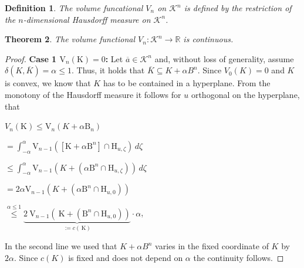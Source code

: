 \documentclass[a4paper]{book}
\newtheorem{theorem}{Theorem}%
\newtheorem{definition}[theorem]{Definition}%
\numberwithin{theorem}{section}%
\begin{document}
\begin{definition}
	The volume funcational $V_{n}$ on $\mathscr{K}^{n}$ is defined by the restriction of the $n$-dimensional Hausdorff measure on $\mathscr{K}^{n}$.
\end{definition}

\begin{theorem}
	The volume functional $V_{n}:\mathscr{K}^{n}\to\mathbb{R}$ is continuous.
\end{theorem}
\begin{proof}
    \textbf{Case 1 $\mathrm{V}_{n}(\mathrm{K})=0$:}
    Let $\overline{a}\in\mathscr{K}^{n}$ and, without loss of generality, assume $\delta(K,\overline{K})=\alpha\leq1$. Thus, it holds that $\overline{K}\subseteq K+\alpha B^{n}$. Since $V_{0}(K)=0$ and $K$ is convex, we know that $K$ has to be contained in a hyperplane. From the monotony of the Hausdorff measure it follows for $u$ orthogonal on the hyperplane, that
    \begin{center}
        $V_{n}(\mathrm{K})\leq \mathrm{V}_{n}(K+\alpha \mathrm{B}_{n})$

        $=\int_{-\alpha}^{\alpha}\mathrm{V}_{n-1}([\mathrm{K}+\alpha \mathrm{B}^{n}]\cap\mathrm{H}_{u,\zeta})\,d\zeta$

        $\leq\int_{-\alpha}^{\alpha}\mathrm{V}_{n-1}(K+(\alpha\mathrm{B}^{n}\cap\mathrm{H}_{u,\zeta}))\,d\zeta$

        $=2\alpha \mathrm{V}_{n-1}(K+(\alpha\mathrm{B}^{n}\cap\mathrm{H}_{u,0}))$

        $\overset{\alpha\leq1}{\leq}\underbrace{2\mathrm{~V}_{n-1}\left(\mathrm{~K}+\left(\mathrm{B}^n\cap \mathrm{H}_{u, 0}\right)\right)}_{:=c(\mathrm{~K})}\cdot\alpha$,
    \end{center}
    In the second line we used that $K+\alpha B^{n}$ varies in the fixed coordinate of $K$ by $2\alpha$. Since $c(K)$ is fixed and does not depend on $\alpha$ the continuity follows.


\end{proof}
\end{document}
